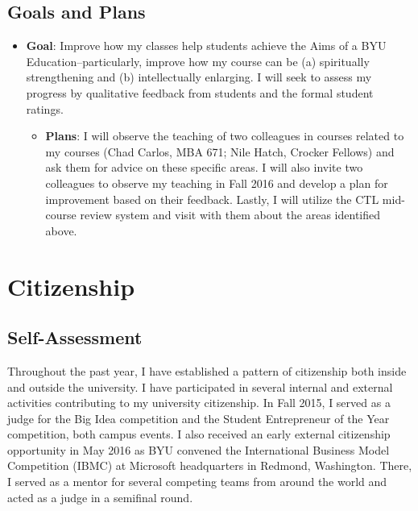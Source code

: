 \documentclass[11pt,article,oneside]{memoir}
\begin{document}
\subsection{Goals and Plans}\label{goals-and-plans-1}

\begin{itemize}
\tightlist
\item
  \textbf{Goal}: Improve how my classes help students achieve the Aims
  of a BYU Education--particularly, improve how my course can be (a)
  spiritually strengthening and (b) intellectually enlarging. I will
  seek to assess my progress by qualitative feedback from students and
  the formal student ratings.

  \begin{itemize}
  \tightlist
  \item
    \textbf{Plans}: I will observe the teaching of two colleagues in
    courses related to my courses (Chad Carlos, MBA 671; Nile Hatch,
    Crocker Fellows) and ask them for advice on these specific areas. I
    will also invite two colleagues to observe my teaching in Fall 2016
    and develop a plan for improvement based on their feedback. Lastly,
    I will utilize the CTL mid-course review system and visit with them
    about the areas identified above.
  \end{itemize}
\end{itemize}

\section{Citizenship}\label{citizenship}

\subsection{Self-Assessment}\label{self-assessment-2}

Throughout the past year, I have established a pattern of citizenship
both inside and outside the university. I have participated in several
internal and external activities contributing to my university
citizenship. In Fall 2015, I served as a judge for the Big Idea
competition and the Student Entrepreneur of the Year competition, both
campus events. I also received an early external citizenship opportunity
in May 2016 as BYU convened the International Business Model Competition
(IBMC) at Microsoft headquarters in Redmond, Washington. There, I served
as a mentor for several competing teams from around the world and acted
as a judge in a semifinal round.
\end{document}
